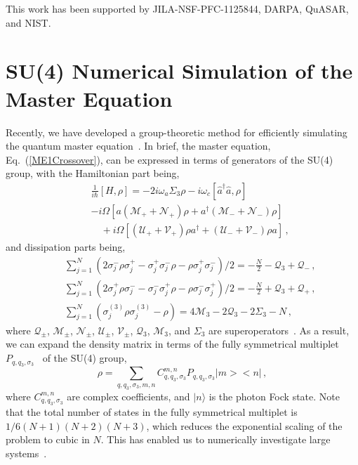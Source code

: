 \documentclass[aps,
twocolumn,
superscriptaddress,groupedaddress]{revtex4}
\begin{document}
This work has been supported by JILA-NSF-PFC-1125844, DARPA, QuASAR, and
NIST.

\appendix

\section{SU(4) Numerical Simulation of the Master Equation}
\label{Su4Appendix}

Recently, we have developed a group-theoretic method for efficiently
simulating the quantum master equation~\cite{Holland13}. In brief, the
master equation, Eq.~(\ref{ME1Crossover}), can be expressed in terms of
generators of the SU(4) group, with the Hamiltonian part being,
\begin{eqnarray}
  &&\frac{1}{i\hbar}[H,\rho]=
  -2i \omega_a \Sigma_3\rho -i\omega_c [ \hat{a}^{\dagger}\hat{a}, \rho]
  \nonumber
  \\
  &&-i\Omega \left[a(\mathcal{M}_++\mathcal{N}_+)\rho+a^\dagger
    (\mathcal{M}_-+\mathcal{N}_-)\rho\right]\nonumber\\
  &&\quad{}+i\Omega\left[(\mathcal{U}_++\mathcal{V}_+)\rho a^\dagger
    +(\mathcal{U}_-+\mathcal{V}_-)\rho a\right]\,,
\end{eqnarray}
and dissipation parts being,
\begin{eqnarray}\label{liv}
 && \sum_{j=1}^N(
   2\sigma_j^-\rho\sigma_j^+-\sigma_j^+ \sigma_j^-\rho-
   \rho \sigma_j^+\sigma_j^-
  )/2=-\frac{N}{2}-
  \mathcal{Q}_3+\mathcal{Q}_{-}\,,\nonumber\\
 && \sum_{j=1}^N(
   2\sigma_j^+\rho\sigma_j^--\sigma_j^- \sigma_j^+\rho-
   \rho \sigma_j^-\sigma_j^+
  )/2=-\frac{N}{2}+
  \mathcal{Q}_3+\mathcal{Q}_{+}\,,\nonumber\\
 && \sum_{j=1}^N(\sigma_j^{(3)}\rho\sigma_j^{(3)}-\rho)=4\mathcal{M}_3-2
  \mathcal{Q}_3-2\Sigma_3-N\,,
  \label{ham}
\end{eqnarray}
where $\mathcal{Q}_{\pm}$, $\mathcal{M}_{\pm}$, $\mathcal{N}_{\pm}$,
$\mathcal{U}_{\pm}$, $\mathcal{V}_{\pm}$, $\mathcal{Q}_3$, $\mathcal{M}_3$,
and $\Sigma_3$ are superoperators~\cite{Holland13}.  As a result, we can
expand the density matrix in terms of the fully symmetrical multiplet
$P_{q,q_3,\sigma_3}$~\cite{Holland13} of the SU(4) group,
\begin{equation}\label{ex}
  \rho=\sum_{q,q_3,\sigma_3,m,n} C_{q,q_3,\sigma_3}^{m,n}
  P_{q,q_3,\sigma_3}\bigl|m\bigr>\bigl<n\bigr|\,,
\end{equation}
where $C_{q,q_3,\sigma_3}^{m,n}$ are complex coefficients, and
$|n\rangle$ is the photon Fock state. Note that the total number of
states in the fully symmetrical multiplet is $1/6 (N+1)(N+2)(N+3)$,
which reduces the exponential scaling of the problem to cubic in $N$.
This has enabled us to numerically investigate large
systems~\cite{Holland13}.
\end{document}
